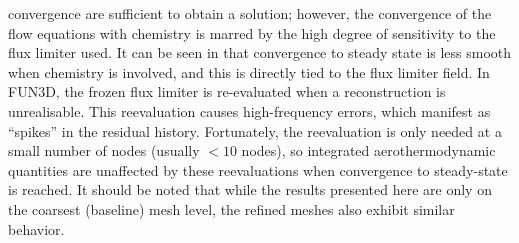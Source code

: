 convergence are sufficient to obtain a solution; however, the convergence of the
flow equations with chemistry is marred by the high degree of sensitivity to the
flux limiter used.  It can be seen in  that convergence
to steady state is less smooth when chemistry is involved, and this is directly
tied to the flux limiter field.  In FUN3D, the frozen flux limiter is
re-evaluated when a reconstruction is unrealisable.  This reevaluation causes
high-frequency errors, which manifest as ``spikes'' in the residual history.
Fortunately, the reevaluation is only needed at a small number of nodes (usually
$< 10$ nodes), so integrated aerothermodynamic quantities are unaffected by
these reevaluations when convergence to steady-state is reached.  It should be
noted that while the results presented here are only on the coarsest (baseline)
mesh level, the refined meshes also exhibit similar behavior.

